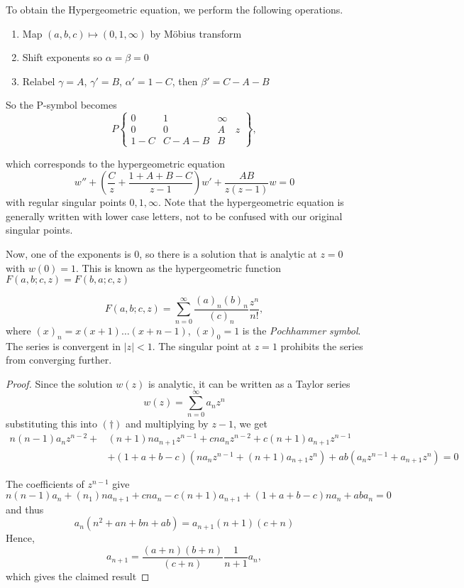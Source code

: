 \documentclass[a4paper]{article}
\begin{document}
To obtain the Hypergeometric equation, we perform the following operations.
\begin{enumerate}
	\item Map $(a,b,c) \mapsto (0, 1, \infty)$ by M\"{o}bius transform \\
	\item Shift exponents so $\alpha = \beta = 0$ \\
	\item Relabel  $\gamma = A$, $\gamma' = B$,  $\alpha' = 1-C$, then  $\beta' = C - A - B$
\end{enumerate}

So the P-symbol becomes
\[
P \begin{Bmatrix} 0 & 1 & \infty & \\
                                0 & 0 & A & z \\
				1-C & C - A - B & B &
			\end{Bmatrix}
,\]

which corresponds to the hypergeometric equation
\[
	w'' + \left( \frac{C}{z} + \frac{1 + A + B - C}{z-1} \right) w' + \frac{AB}{z(z-1)}w = 0 \tag{\dagger}
\] with regular singular points $0, 1, \infty$. Note that the hypergeometric equation is generally written with lower case letters, not to be confused with our original singular points.

Now, one of the exponents is $0$, so there is a solution that is analytic at $z=0$ with $w(0)=1$. This is known as the hypergeometric function  $F(a, b; c, z) = F(b, a; c, z)$

\begin{prop}
	\[
		F(a, b; c, z) = \sum_{n=0}^{\infty} \frac{(a)_{n} (b)_{n}}{(c)_{n}} \frac{z^{n}}{n!}
	,\] where $(x)_n = x(x+1)\ldots(x+n-1)$, $(x)_0 = 1$ is the \textit{Pochhammer symbol}.
	The series is convergent in $|z| <1$. The singular point at $z=1$ prohibits the series from converging further.
\end{prop}

\begin{proof}
	Since the solution $w(z)$ is analytic, it can be written as a Taylor series
	\[
		w(z) = \sum_{n=0}^{\infty} a_n z^{n}
	\] 
	substituting this into $(\dagger)$ and multiplying by $z-1$, we get
	\begin{align*}
		n(n-1)a_n z^{n-2} + &(n+1)na_{n+1}z^{n-1} + cn a_n z^{n-2} + c(n+1) a_{n+1}z^{n-1} \\
									    &+ (1+a+b-c)(na_n z^{n-1} + (n+1)a_{n+1}z^{n}) + ab(a_nz^{n-1} + a_{n+1}z^{n}) = 0
	\end{align*} 

	The coefficients of $z^{n-1}$ give
	\[
		n(n-1)a_n + (n_1)n a_{n+1} + cn a_n - c(n+1)a_{n+1} + (1+a+b-c)na_n + aba_n = 0
	\] 
	and thus 
	\[
		a_n (n^2 + an + bn + ab) = a_{n+1}(n+1)(c+n)
	\]
	Hence,
	\[
		a_{n+1} = \frac{(a+n)(b+n)}{(c+n)} \frac{1}{n+1} a_n
	,\] which gives the claimed result 
\end{proof}
\end{document}
